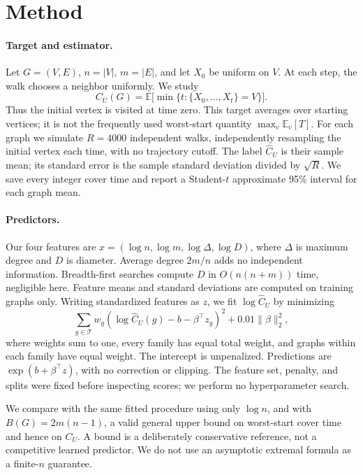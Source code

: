 \documentclass{article}
\begin{document}
\section{Method}
\paragraph{Target and estimator.}
Let $G=(V,E)$, $n=|V|$, $m=|E|$, and let $X_0$ be uniform on $V$.
At each step, the walk chooses a neighbor uniformly. We study
\begin{equation}
 C_U(G)=\mathbb{E}\big[\min\{t:\{X_0,\ldots,X_t\}=V\}\big].
\end{equation}
Thus the initial vertex is visited at time zero. This target averages over
starting vertices; it is not the frequently used worst-start quantity
$\max_v\mathbb{E}_v[T]$. For each graph we simulate $R=4000$ independent
walks, independently resampling the initial vertex each time, with no
trajectory cutoff. The label $\widehat C_U$ is their sample mean; its standard
error is the sample standard deviation divided by $\sqrt R$. We save every
integer cover time and report a Student-$t$ approximate 95\% interval for
each graph mean.

\paragraph{Predictors.}
Our four features are $x=(\log n,\log m,\log\Delta,\log D)$, where
$\Delta$ is maximum degree and $D$ is diameter. Average degree $2m/n$ adds
no independent information. Breadth-first searches compute $D$ in
$O(n(n+m))$ time, negligible here. Feature means and standard deviations
are computed on training graphs only. Writing standardized features as $z$,
we fit $\log\widehat C_U$ by minimizing
\begin{equation}
 \sum_{g\in\mathcal T}w_g
 (\log\widehat C_U(g)-b-\beta^\top z_g)^2
 +0.01\|\beta\|_2^2,
\end{equation}
where weights sum to one, every family has equal total weight, and graphs
within each family have equal weight. The intercept is unpenalized.
Predictions are $\exp(b+\beta^\top z)$, with no correction or clipping.
The feature set, penalty, and splits were fixed before inspecting scores;
we perform no hyperparameter search.

We compare with the same fitted procedure using only $\log n$, and with
$B(G)=2m(n-1)$, a valid general upper bound on worst-start cover time and
hence on $C_U$. A bound is a deliberately conservative reference, not a
competitive learned predictor. We do not use an asymptotic extremal formula
as a finite-$n$ guarantee.
\end{document}
